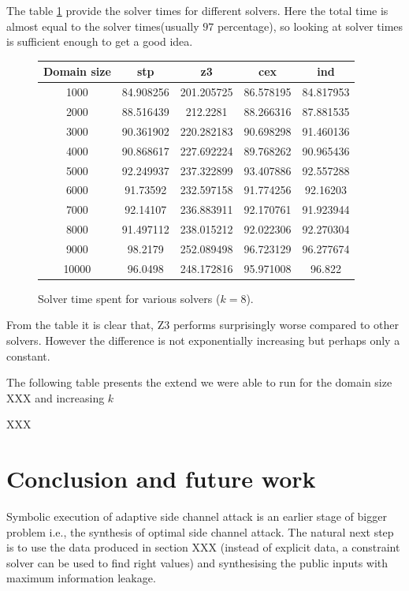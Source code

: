 \documentclass[11pt,a4paper,notitlepage]{article}
\begin{document}
The table \ref{fig:solvertime} provide the solver times for different solvers.
Here the total time is almost equal to the solver times(usually $97$ percentage),
so looking at solver times is sufficient enough to get a good idea.

\begin{figure}
\centering
\begin{tabular}{|c|c|c|c|c|}
\hline
\textbf{Domain size} & stp & z3 & cex & ind \\ \hline \hline
1000 & 84.908256 & 201.205725 & 86.578195 & 84.817953 \\
2000 & 88.516439 & 212.2281 & 88.266316 & 87.881535 \\
3000 & 90.361902 & 220.282183 & 90.698298 & 91.460136 \\
4000 & 90.868617 & 227.692224 & 89.768262 & 90.965436 \\
5000 & 92.249937 & 237.322899 & 93.407886 & 92.557288 \\
6000 & 91.73592 & 232.597158 & 91.774256 & 92.16203 \\
7000 & 92.14107 & 236.883911 & 92.170761 & 91.923944 \\
8000 & 91.497112 & 238.015212 & 92.022306 & 92.270304 \\
9000 & 98.2179 & 252.089498 & 96.723129 & 96.277674 \\
10000 & 96.0498 & 248.172816 & 95.971008 & 96.822 \\
\hline
\end{tabular}
\caption{Solver time spent for various solvers ($k = 8$).}
\label{fig:solvertime}
\end{figure}


From the table it is clear that, Z3 performs surprisingly worse compared to other solvers.
However the difference is not exponentially increasing but perhaps only a constant.

The following table presents the extend we were able to run for the domain size XXX and increasing $k$

XXX


\section{Conclusion and future work}
\label{sec:futurework}

Symbolic execution of adaptive side channel attack is an earlier stage of bigger problem i.e., the synthesis of optimal side channel attack.
The natural next step is to use the data produced in section XXX (instead of explicit data, a constraint solver can be used to find right values) and synthesising the public inputs with maximum information leakage.
\end{document}
